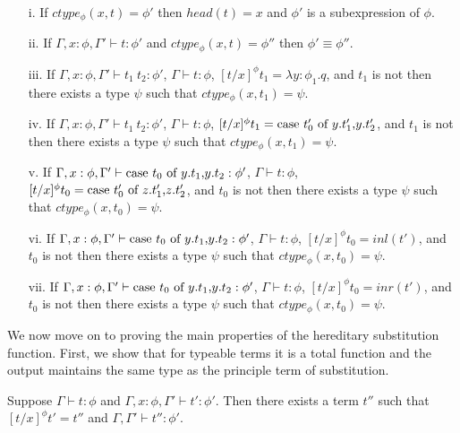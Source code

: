 \begin{lemma}
  \label{lemma:ctype_props_ssfp}

  \begin{itemize}
  \small
  \item[]
  \item[i.] If $ctype_\phi(x,t) = \phi'$ then $head(t) = x$ and $\phi'$ 
    is a subexpression of $\phi$.
    
  \item[ii.] If $\Gamma,x:\phi,\Gamma' \vdash t:\phi'$ and $ctype_\phi(x,t) = \phi''$ then
    $\phi' \equiv \phi''$.

  \item[iii.] If $\Gamma,x:\phi,\Gamma' \vdash t_1\ t_2:\phi'$, $\Gamma \vdash t:\phi$,
    $[t/x]^\phi t_1 = \lambda y:\phi_1.q$, and $t_1$ is not then there exists a type
    $\psi$ such that $ctype_\phi(x,t_1) = \psi$.

  \item[iv.] If $\Gamma,x:\phi,\Gamma' \vdash t_1\ t_2:\phi'$, $\Gamma \vdash t:\phi$,
    $[t/x]^\phi t_1 = \mbox{case}\ t'_0\ \text{of}\ y\text{.}t'_1\text{,}y\text{.}t'_2$, and $t_1$ is not then there exists a type
    $\psi$ such that $ctype_\phi(x,t_1) = \psi$.

  \item[v.] If $\Gamma,x:\phi,\Gamma' \vdash \mbox{case}\ t_0\ \text{of}\ y\text{.}t_1\text{,}y\text{.}t_2:\phi'$, 
    $\Gamma \vdash t:\phi$, $[t/x]^\phi t_0 = \mbox{case}\ t'_0\ \text{of}\ z\text{.}t'_1\text{,}z\text{.}t'_2$, and 
    $t_0$ is not then there exists a type $\psi$ such that $ctype_\phi(x,t_0) = \psi$.

  \item[vi.] If $\Gamma,x:\phi,\Gamma' \vdash \mbox{case}\ t_0\ \text{of}\ y\text{.}t_1\text{,}y\text{.}t_2:\phi'$, 
    $\Gamma \vdash t:\phi$, $[t/x]^\phi t_0 = inl(t')$, and $t_0$ is not then there 
    exists a type $\psi$ such that $ctype_\phi(x,t_0) = \psi$.

  \item[vii.] If $\Gamma,x:\phi,\Gamma' \vdash \mbox{case}\ t_0\ \text{of}\ y\text{.}t_1\text{,}y\text{.}t_2:\phi'$, 
    $\Gamma \vdash t:\phi$, $[t/x]^\phi t_0 = inr(t')$, and $t_0$ is not then 
    there exists a type $\psi$ such that $ctype_\phi(x,t_0) = \psi$.
  \end{itemize}
\end{lemma}
We now move on to proving the main properties of the hereditary
substitution function.  First, we show that for typeable terms it is a
total function and the output maintains the same type as the principle
term of substitution.
\begin{lemma}
  \label{lemma:total_ssfp}
  Suppose $\Gamma \vdash t : \phi$ and $\Gamma, x:\phi, \Gamma' \vdash t':\phi'$. Then
  there exists a term $t''$ such that $[t/x]^\phi t' = t''$ and 
  $\Gamma,\Gamma' \vdash t'':\phi'$.
\end{lemma}
